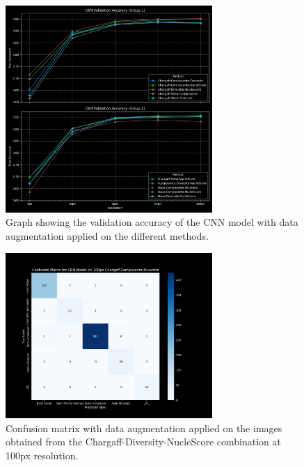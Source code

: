 \begin{appendices}
	\begin{figure}[H]
		\centering
		\includegraphics[width=0.7\textwidth]{../imgs/graphs/kfold/cnn_validation_accuracy_groups_mask_5_kfold_aug.png}
		\caption{Graph showing the validation accuracy of the CNN model with data augmentation applied on the different methods.}
		\label{fig:augmentation_accuracy}
	\end{figure}

	\begin{figure}[H]
		\centering
		\includegraphics[width=0.7\textwidth]{../imgs/graphs/kfold/cnn_confusion_matrix_100px_mask_5-kfold_aug.png}
		\caption{Confusion matrix with data augmentation applied on the images obtained from the Chargaff-Diversity-NucleScore
			combination at 100px resolution.}
		\label{fig:augmentation_confusion_matrix}
	\end{figure}


\end{appendices}
